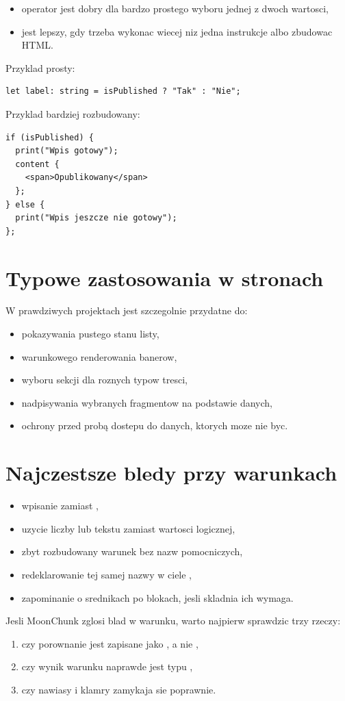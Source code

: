 \begin{itemize}
  \item operator  jest dobry dla bardzo prostego wyboru jednej z dwoch wartosci,
  \item {} jest lepszy, gdy trzeba wykonac wiecej niz jedna instrukcje albo zbudowac HTML.
\end{itemize}

Przyklad prosty:

\begin{lstlisting}[style=moonchunk,caption={Operator warunkowy do malego wyboru}]
let label: string = isPublished ? "Tak" : "Nie";
\end{lstlisting}

Przyklad bardziej rozbudowany:

\begin{lstlisting}[style=moonchunk,caption={if do wiekszej logiki}]
if (isPublished) {
  print("Wpis gotowy");
  content {
    <span>Opublikowany</span>
  };
} else {
  print("Wpis jeszcze nie gotowy");
};
\end{lstlisting}

\section{Typowe zastosowania w stronach}
W prawdziwych projektach  jest szczegolnie przydatne do:

\begin{itemize}
  \item pokazywania pustego stanu listy,
  \item warunkowego renderowania banerow,
  \item wyboru sekcji dla roznych typow tresci,
  \item nadpisywania wybranych fragmentow na podstawie danych,
  \item ochrony przed probą dostepu do danych, ktorych moze nie byc.
\end{itemize}

\section{Najczestsze bledy przy warunkach}
\begin{itemize}
  \item wpisanie \mc{=} zamiast \mc{==},
  \item uzycie liczby lub tekstu zamiast wartosci logicznej,
  \item zbyt rozbudowany warunek bez nazw pomocniczych,
  \item redeklarowanie tej samej nazwy w ciele ,
  \item zapominanie o srednikach po blokach, jesli skladnia ich wymaga.
\end{itemize}

Jesli MoonChunk zglosi blad w warunku, warto najpierw sprawdzic trzy rzeczy:

\begin{enumerate}
  \item czy porownanie jest zapisane jako \mc{==}, a nie \mc{=},
  \item czy wynik warunku naprawde jest typu ,
  \item czy nawiasy i klamry zamykaja sie poprawnie.
\end{enumerate}
